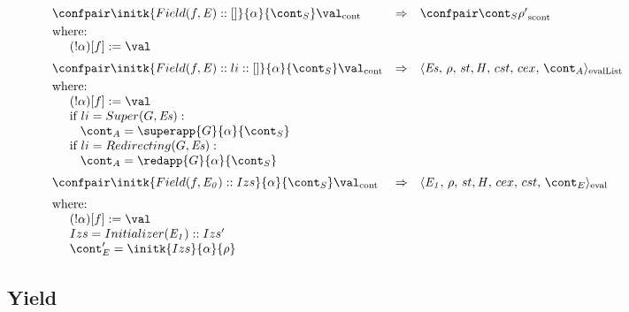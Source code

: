 \documentclass{article}
\begin{document}
\[
  \begin{array}{lcl@{\hspace{30mm}}}
	\contconf{\initk{Field(f, \expr) :: []}{\loc}{\scont}}{\val}
	& \Rightarrow &
	\scontconf{\scont}{\env'}\\[1mm]
	\textrm{where:}\\
	\hspace{5mm}\update{(\deref{\loc})[f]}{\val}\\[2mm]

	\contconf{\initk{Field(f, \expr) :: li :: []}{\loc}{\scont}}{\val}
	& \Rightarrow &
	\evallistconf{\exprs}{\env}{\strace}{\cstrace}{\cex}{\acont}\\[1mm]
	\textrm{where:}\\
	\hspace{5mm}\update{(\deref{\loc})[f]}{\val}\\
	\hspace{5mm}\textrm{if } li = Super(G, \exprs):\\
	\hspace{8mm}\acont = \superapp{G}{\loc}{\scont}\\
	\hspace{5mm}\textrm{if } li = Redirecting(G, \exprs):\\
	\hspace{8mm}\acont = \redapp{G}{\loc}{\scont}\\[2mm]

	\contconf{\initk{Field(f, \expri{0}) :: Izs}{\loc}{\scont}}{\val}
	& \Rightarrow &
	\evalconf{\expri{1}}{\env}{st}{cex}{cst}{\econt}\\[2mm]
	\textrm{where:}\\
	\hspace{5mm}\update{(\deref\loc)[f]}{\val}\\
	\hspace{5mm}Izs = Initializer(\expri{1}) :: Izs'\\
	\hspace{5mm}\econt' = \initk{Izs}{\loc}{\env}
  \end{array}
\]

\subsection{Yield}
\end{document}
